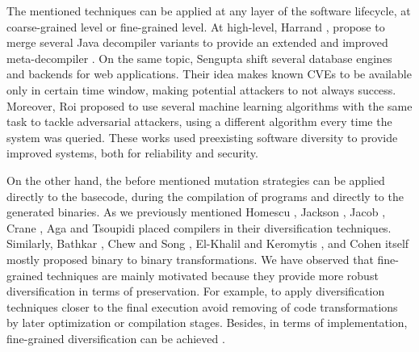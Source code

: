 The mentioned techniques can be applied at any layer of the software lifecycle, at coarse-grained level or fine-grained level.
At high-level, Harrand \etal, propose to merge several Java decompiler variants to provide an extended and improved meta-decompiler \cite{harrand2020java}. On the same topic, Sengupta \etal \cite{10.5555/3091125.3091155} shift several database engines and backends for web applications. Their idea makes known CVEs to be available only in certain time window, making potential attackers to not always success. Moreover, Roi \etal \cite{10.1145/3318216.3363338} proposed to use several machine learning algorithms with the same task to tackle adversarial attackers, using a different algorithm every time the system was queried.
These works used preexisting software diversity to provide improved systems, both for reliability and security.

On the other hand, the before mentioned mutation strategies can be applied directly to the basecode, during the compilation of programs and directly to the generated binaries. As we previously mentioned Homescu \etal \cite{homescu2013profile}, Jackson \etal {}, Jacob \etal \cite{jacob2008superdiversifier}, Crane \etal \cite{crane2015thwarting}, Aga \etal \cite{aga2019smokestack} and Tsoupidi \etal \cite{Tsoupidi2020ConstraintBasedSD} placed compilers in their diversification techniques. Similarly, Bathkar \etal \cite{bhatkar03,bhatkar2005efficient}, Chew and Song \cite{Chew02mitigatingbuffer}, El-Khalil and Keromytis \cite{ElKhalil2004}, and Cohen \cite{cohen1993operating} itself mostly proposed binary to binary transformations. 
We have observed that fine-grained techniques are mainly motivated because they provide more robust diversification in terms of preservation. For example, to apply diversification techniques closer to the final execution avoid removing of code transformations by later optimization or compilation stages. Besides, in terms of implementation, fine-grained diversification can be achieved .

